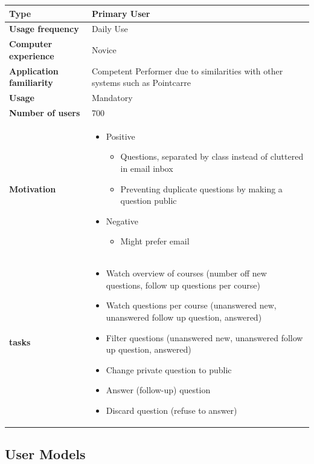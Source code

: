 \documentclass[10pt]{report}
\begin{document}
\begin{tabular}{ | l | p{10cm} |}
\hline
\textbf{Type} & Primary User \\ \hline
\textbf{Usage frequency} & Daily Use \\ \hline
\textbf{Computer experience} & Novice \\ \hline
\textbf{Application familiarity} & Competent Performer due to similarities with other systems such as Pointcarre \\ \hline
\textbf{Usage} & Mandatory\\ \hline
\textbf{Number of users} & 700\\ \hline
\textbf{Motivation} & 
	\begin{itemize}
		\item Positive 
		\begin{itemize}
			\item Questions, separated by class instead of cluttered in email inbox
			\item Preventing duplicate questions by making a question public
		\end{itemize}
		\item Negative 
		\begin{itemize}
			\item Might prefer email
		\end{itemize}
	\end{itemize} \\ \hline
\textbf{tasks} & 
	\begin{itemize}
		\item Watch overview of courses (number off new questions, follow up questions per course)
		\item Watch questions per course (unanswered new, unanswered follow up question, answered)
		\item Filter questions (unanswered new, unanswered follow up question, answered)
		\item Change private question to public
		\item Answer (follow-up) question
		\item Discard question (refuse to answer)
	\end{itemize} \\ \hline
\end{tabular}

\subsection{User Models}
\end{document}
